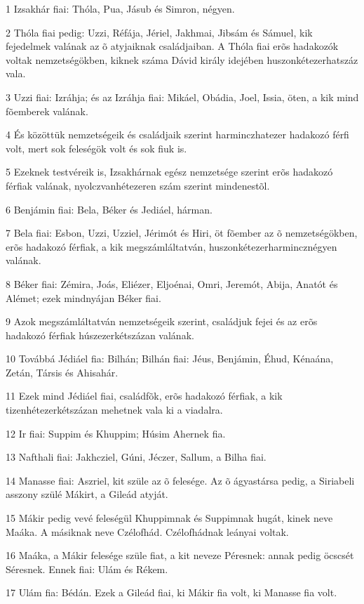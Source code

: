 \par 1 Izsakhár fiai: Thóla, Pua, Jásub és Simron, négyen.
\par 2 Thóla fiai pedig: Uzzi, Réfája, Jériel, Jakhmai, Jibsám és Sámuel, kik fejedelmek valának az õ atyjaiknak családjaiban. A Thóla fiai erõs hadakozók voltak nemzetségökben, kiknek száma Dávid király idejében huszonkétezerhatszáz vala.
\par 3 Uzzi fiai: Izráhja; és az Izráhja fiai: Mikáel, Obádia, Joel, Issia, öten, a kik mind fõemberek valának.
\par 4 És közöttük nemzetségeik és családjaik szerint harminczhatezer hadakozó férfi volt, mert sok feleségök volt és sok fiuk is.
\par 5 Ezeknek testvéreik is, Izsakhárnak egész nemzetsége szerint erõs hadakozó férfiak valának, nyolczvanhétezeren szám szerint mindenestõl.
\par 6 Benjámin fiai: Bela, Béker és Jediáel, hárman.
\par 7 Bela fiai: Esbon, Uzzi, Uzziel, Jérimót és Hiri, öt fõember az õ nemzetségökben, erõs hadakozó férfiak, a kik megszámláltatván, huszonkétezerharmincznégyen valának.
\par 8 Béker fiai: Zémira, Joás, Eliézer, Eljoénai, Omri, Jeremót, Abija, Anatót és Alémet; ezek mindnyájan Béker fiai.
\par 9 Azok megszámláltatván nemzetségeik szerint, családjuk fejei és az erõs hadakozó férfiak húszezerkétszázan valának.
\par 10 Továbbá Jédiáel fia: Bilhán; Bilhán fiai: Jéus, Benjámin, Éhud, Kénaána, Zetán, Társis és Ahisahár.
\par 11 Ezek mind Jédiáel fiai, családfõk, erõs hadakozó férfiak, a kik tizenhétezerkétszázan mehetnek vala ki a viadalra.
\par 12 Ir fiai: Suppim és Khuppim; Húsim Ahernek fia.
\par 13 Nafthali fiai: Jakhcziel, Gúni, Jéczer, Sallum, a Bilha fiai.
\par 14 Manasse fiai: Aszriel, kit szüle az õ felesége. Az õ ágyastársa pedig, a Siriabeli asszony szülé Mákirt, a Gileád atyját.
\par 15 Mákir pedig vevé feleségül Khuppimnak és Suppimnak hugát, kinek neve Maáka. A másiknak neve Czélofhád. Czélofhádnak leányai voltak.
\par 16 Maáka, a Mákir felesége szüle fiat, a kit neveze Péresnek: annak pedig öcscsét Séresnek. Ennek fiai: Ulám és Rékem.
\par 17 Ulám fia: Bédán. Ezek a Gileád fiai, ki Mákir fia volt, ki Manasse fia volt.
